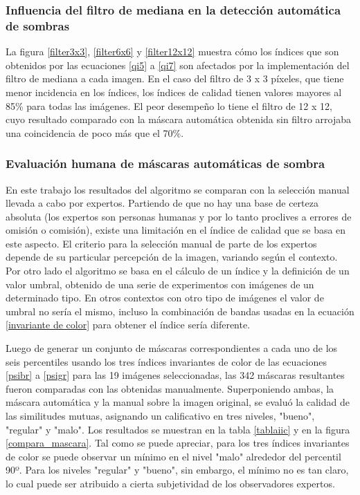 \subsubsection{Influencia del filtro de mediana en la detección automática de sombras}

La figura \ref{filter3x3}, \ref{filter6x6} y \ref{filter12x12} muestra cómo los índices que son obtenidos por las ecuaciones \ref{qi5} a \ref{qi7} son afectados por la implementación del filtro de mediana a cada imagen. En el caso del filtro de 3 x 3 píxeles, que tiene menor incidencia en los índices, los índices de calidad tienen valores mayores al 85\% para todas las imágenes. El peor desempeño lo tiene el filtro de 12 x 12, cuyo resultado comparado con la máscara automática obtenida sin filtro arrojaba una coincidencia de poco más que el 70\%.

\subsubsection{Evaluación humana de máscaras automáticas de sombra}

En este trabajo los resultados del algoritmo se comparan con la selección manual llevada a cabo por expertos. Partiendo de que no hay una base de certeza absoluta (los expertos son personas humanas y por lo tanto proclives a errores de omisión o comisión), existe una limitación en el índice de calidad que se basa en este aspecto. El criterio para la selección manual de parte de los expertos depende de su particular percepción de la imagen, variando según el contexto. Por otro lado el algoritmo se basa en el cálculo de un índice y la definición de un valor umbral, obtenido de una serie de experimentos con imágenes de un determinado tipo. En otros contextos con otro tipo de imágenes el valor de umbral no sería el mismo, incluso la combinación de bandas usadas en la ecuación \ref{invariante de color} para obtener el índice sería diferente.

Luego de generar un conjunto de máscaras correspondientes a cada uno de los seis percentiles usando los tres índices invariantes de color de las ecuaciones \ref{psibr} a \ref{psigr} para las 19 imágenes seleccionadas, las 342 máscaras resultantes fueron comparadas con las obtenidas manualmente. Superponiendo ambas, la máscara automática y la manual sobre la imagen original, se evaluó la calidad de las similitudes mutuas, asignando un calificativo en tres niveles, "bueno", "regular" y "malo". Los resultados se muestran en la tabla \ref{tablaiic} y en la figura \ref{compara_mascara}. Tal como se puede apreciar, para los tres índices invariantes de color se puede observar un mínimo en el nivel "malo" alrededor del percentil 90º. Para los niveles "regular" y "bueno", sin embargo, el mínimo no es tan claro, lo cual puede ser atribuido a cierta subjetividad de los observadores expertos.

